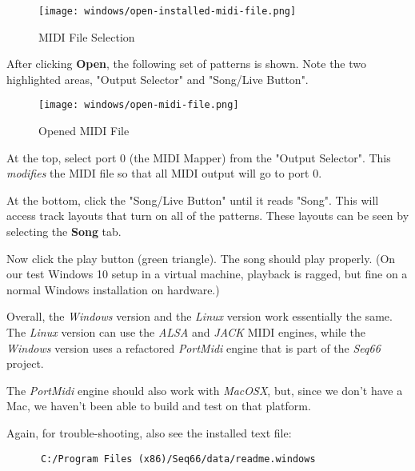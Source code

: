 \begin{figure}[H]
   \centering 
   \texttt{[image: windows/open-installed-midi-file.png]}
   \caption{MIDI File Selection}
   \label{fig:windows_open_installed_midi_file}
\end{figure}

   After clicking \textbf{Open}, the following set of patterns is shown.
   Note the two highlighted areas, "Output Selector" and "Song/Live Button".

\begin{figure}[H]
   \centering 
   \texttt{[image: windows/open-midi-file.png]}
   \caption{Opened MIDI File}
   \label{fig:windows_open_midi_file}
\end{figure}

   At the top, select port 0 (the MIDI Mapper) from the "Output Selector".
   This \textsl{modifies} the MIDI file so that all MIDI
   output will go to port 0.

   At the bottom, click the "Song/Live Button" until it reads "Song".
   This will access track layouts that turn on all of the patterns.
   These layouts can be seen by selecting the \textbf{Song} tab.

   Now click the play button (green triangle).
   The song should play properly.
   (On our test Windows 10 setup in a virtual machine, playback is ragged,
   but fine on a normal Windows installation on hardware.)

   Overall, the \textsl{Windows} version and the \textsl{Linux} version
   work essentially the same. The \textsl{Linux} version can use the
   \textsl{ALSA} and \textsl{JACK} MIDI engines, while the \textsl{Windows}
   version uses a refactored \textsl{PortMidi} engine that is part of the
   \textsl{Seq66} project.

   The \textsl{PortMidi} engine should also work with \textsl{MacOSX}, but,
   since we don't have a Mac, we haven't been able to build and test
   on that platform.

   Again, for trouble-shooting, also see the installed text file:

   \begin{verbatim}
      C:/Program Files (x86)/Seq66/data/readme.windows
   \end{verbatim}

